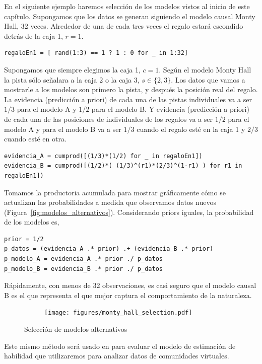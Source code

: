 \documentclass[a4paper,10pt]{book}
\theoremstyle{definition}
\begin{document}
En el siguiente ejemplo haremos selecci\'on de los modelos vistos al inicio de este cap\'itulo.
%
Supongamos que los datos se generan siguiendo el modelo causal Monty Hall, 32 veces.
%
Alrededor de una de cada tres veces el regalo estar\'a escondido detr\'as de la caja 1, $r=1$.
%
\begin{lstlisting}[backgroundcolor=\color{all}]
regaloEn1 = [ rand(1:3) == 1 ? 1 : 0 for _ in 1:32]
\end{lstlisting} 
%
Supongamos que siempre elegimos la caja 1, $c=1$.
%
Seg\'un el modelo Monty Hall la pista s\'olo se\~nalara a la caja 2 o la caja 3, $s \in \{2,3\}$.
%
Los datos que vamos a mostrarle a los modelos son primero la pista, y despu\'es la posici\'on real del regalo.
%
La evidencia (predicci\'on a priori) de cada una de las pistas individuales va a ser $1/3$ para el modelo A y $1/2$ para el modelo B.
%
Y evidencia (predicci\'on a priori) de cada una de las posiciones de individuales de los regalos va a ser $1/2$ para el modelo A y para el modelo B va a ser $1/3$ cuando el regalo est\'e en la caja 1 y $2/3$ cuando est\'e en otra.
%
\begin{lstlisting}[backgroundcolor=\color{all}]
evidencia_A = cumprod([(1/3)*(1/2) for _ in regaloEn1])
evidencia_B = cumprod([(1/2)*( (1/3)^(r1)*(2/3)^(1-r1) ) for r1 in regaloEn1])
\end{lstlisting} 
%
Tomamos la productoria acumulada para mostrar gr\'aficamente c\'omo se actualizan las probabilidades a medida que observamos datos nuevos (Figura~\ref{fig:modelos_alternativos}).
%
Considerando priors iguales, la probabilidad de los modelos es,
%
\begin{lstlisting}[backgroundcolor=\color{all}]
prior = 1/2
p_datos = (evidencia_A .* prior) .+ (evidencia_B .* prior)
p_modelo_A = evidencia_A .* prior ./ p_datos
p_modelo_B = evidencia_B .* prior ./ p_datos
\end{lstlisting} 
%
R\'apidamente, con menos de 32 observaciones, es casi seguro que el modelo causal B es el que representa el que mejor captura el comportamiento de la naturaleza.
%
\begin{figure}[H]
    \centering
    \begin{subfigure}[b]{0.5\textwidth}
    \texttt{[image: figures/monty\_hall\_selection.pdf]}
    \end{subfigure}
    \caption{
    Selecci\'on de modelos alternativos
    }
    \label{fig:estrategias_individuales}
\end{figure}
%
Este mismo m\'etodo ser\'a usado en para evaluar el modelo de estimaci\'on de habilidad que utilizaremos para analizar datos de comunidades virtuales.
\end{document}
